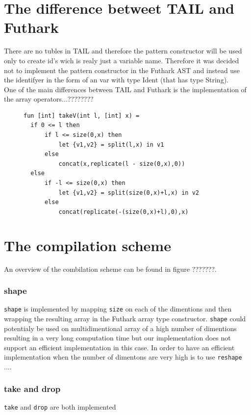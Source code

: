 \documentclass[11pt]{article}
\begin{document}
\section{The difference betweet TAIL and Futhark}
There are no tubles in TAIL and therefore the pattern constructor will be used only to create id's wich is realy just a variable name. Therefore it was decided not to implement the pattern constructor in the Futhark AST and instead use the identifyer in the form of an var with type Ident (that has type String). \\

One of the main differences between TAIL and Futhark is the implementation of the array operators...???????? \\
\begin{figure}
\begin{lstlisting}
fun [int] takeV(int l, [int] x) =
  if 0 <= l then
      if l <= size(0,x) then
          let {v1,v2} = split(l,x) in v1
      else
          concat(x,replicate(l - size(0,x),0))
  else
      if -l <= size(0,x) then
          let {v1,v2} = split(size(0,x)+l,x) in v2
      else
          concat(replicate(-(size(0,x)+l),0),x)
\end{lstlisting}
\end{figure}
\section{The compilation scheme}
An overview of the combilation scheme can be found in figure ???????. 

\subsubsection{shape}
\verb|shape| is implemented by mapping \verb|size| on each of the dimentions and then wrapping the resulting array in the Futhark array type constructor. 
\verb|shape| could potentialy be used on multidimentional array of a high number of dimentions resulting in a very long computation time but our implementation does not support an efficient implementation in this case. In order to have an efficient implementation when the number of dimentons are very high is to use \verb|reshape| .... \\

\subsubsection{take and drop}
\verb|take| and \verb|drop| are both implemented
\end{document}
